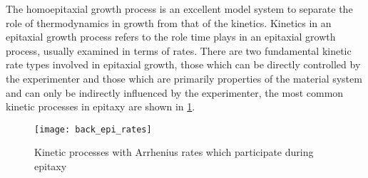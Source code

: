 The homoepitaxial growth process is an excellent model system to separate the role of thermodynamics in growth from that of the kinetics. Kinetics in an epitaxial growth process refers to the role time plays in an epitaxial growth process, usually examined in terms of rates. There are two fundamental kinetic rate types involved in epitaxial growth, those which can be directly controlled by the experimenter and those which are primarily properties of the material system and can only be indirectly influenced by the experimenter, the most common kinetic processes in epitaxy are shown in \cref{fig:back_epi_rates}.
\begin{figure}
    \centering
    \texttt{[image: back\_epi\_rates]}
    \caption[Kinetic Processes of atoms on surfaces]{\label{fig:back_epi_rates}Kinetic processes with Arrhenius rates which participate during epitaxy}
\end{figure}


